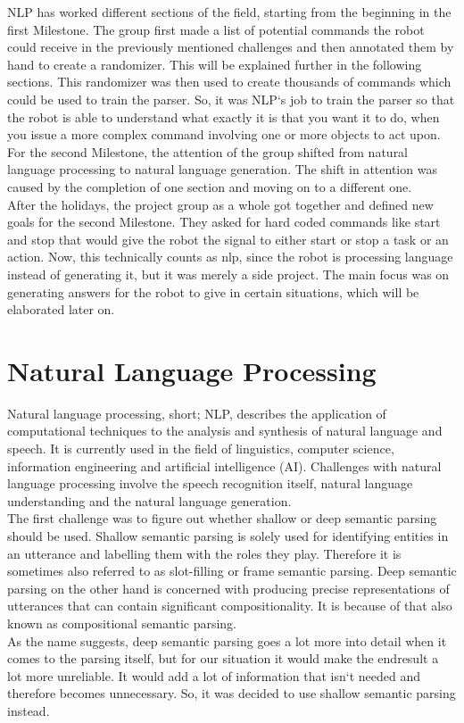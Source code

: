 \documentclass[main.tex]{subfiles}
\begin{document}
			
	NLP has worked different sections of the field, starting from the beginning in the first Milestone. The group first made a list of potential commands the robot could receive in the previously mentioned challenges and then annotated them by hand to create a randomizer. This will be explained further in the following sections. This randomizer was then used to create thousands of commands which could be used to train the parser. So, it was NLP‘s job to train the parser so that the robot is able to understand what exactly it is that you want it to do, when you issue a more complex command involving one or more objects to act upon.\\ 
	For the second Milestone, the attention of the group shifted from natural language processing to natural language generation. The shift in attention was caused by the completion of one section and moving on to a different one.\\ 
	After the holidays, the project group as a whole got together and defined new goals for the second Milestone. They asked for hard coded commands like start and stop that would give the robot the signal to either start or stop a task or an action. Now, this technically counts as nlp, since the robot is processing language instead of generating it, but it was merely a side project. The main focus was on generating answers for the robot to give in certain situations, which will be elaborated later on.
		
	 \section{Natural Language Processing}
	Natural language processing, short; NLP, describes the application of computational techniques to the analysis and synthesis of natural language and speech. It is currently used in the field of linguistics, computer science, information engineering and artificial intelligence (AI). Challenges with natural language processing involve the speech recognition itself, natural language understanding and the natural language generation.\\ 
	The first challenge was to figure out whether shallow or deep semantic parsing should be used. Shallow semantic parsing is solely used for identifying entities in an utterance and labelling them with the roles they play. Therefore it is sometimes also referred to as slot-filling or frame semantic parsing. Deep semantic parsing on the other hand is concerned with producing precise representations of utterances that can contain significant compositionality. It is because of that also known as compositional semantic parsing.\\ 
	As the name suggests, deep semantic parsing goes a lot more into detail when it comes to the parsing itself, but for our situation it would make the endresult a lot more unreliable. It would add a lot of information that isn‘t needed and therefore becomes unnecessary. So, it was decided to use shallow semantic parsing instead.
\end{document}
